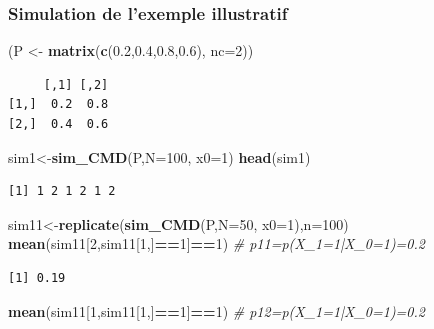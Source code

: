 \documentclass[
]{book}
\newenvironment{Shaded}{\begin{snugshade}}{\end{snugshade}}
\newcommand{\CommentTok}[1]{\textcolor[rgb]{0.56,0.35,0.01}{\textit{#1}}}
\newcommand{\DataTypeTok}[1]{\textcolor[rgb]{0.13,0.29,0.53}{#1}}
\newcommand{\DecValTok}[1]{\textcolor[rgb]{0.00,0.00,0.81}{#1}}
\newcommand{\FloatTok}[1]{\textcolor[rgb]{0.00,0.00,0.81}{#1}}
\newcommand{\KeywordTok}[1]{\textcolor[rgb]{0.13,0.29,0.53}{\textbf{#1}}}
\newcommand{\NormalTok}[1]{#1}
\newcommand{\OperatorTok}[1]{\textcolor[rgb]{0.81,0.36,0.00}{\textbf{#1}}}
\newcommand{\StringTok}[1]{\textcolor[rgb]{0.31,0.60,0.02}{#1}}
\theoremstyle{definition}
\theoremstyle{definition}
\theoremstyle{definition}
\theoremstyle{remark}
\begin{document}
\hypertarget{simulation-de-lexemple-illustratif}{%
\subsubsection{Simulation de l'exemple illustratif}\label{simulation-de-lexemple-illustratif}}

\begin{Shaded}
\begin{Highlighting}[]
\NormalTok{(P <-}\StringTok{ }\KeywordTok{matrix}\NormalTok{(}\KeywordTok{c}\NormalTok{(}\FloatTok{0.2}\NormalTok{,}\FloatTok{0.4}\NormalTok{,}\FloatTok{0.8}\NormalTok{,}\FloatTok{0.6}\NormalTok{), }\DataTypeTok{nc=}\DecValTok{2}\NormalTok{))}
\end{Highlighting}
\end{Shaded}

\begin{verbatim}
     [,1] [,2]
[1,]  0.2  0.8
[2,]  0.4  0.6
\end{verbatim}

\begin{Shaded}
\begin{Highlighting}[]
\NormalTok{sim1<-}\KeywordTok{sim_CMD}\NormalTok{(P,}\DataTypeTok{N=}\DecValTok{100}\NormalTok{, }\DataTypeTok{x0=}\DecValTok{1}\NormalTok{)}
\KeywordTok{head}\NormalTok{(sim1)}
\end{Highlighting}
\end{Shaded}

\begin{verbatim}
[1] 1 2 1 2 1 2
\end{verbatim}

\begin{Shaded}
\begin{Highlighting}[]
\NormalTok{sim11<-}\KeywordTok{replicate}\NormalTok{(}\KeywordTok{sim_CMD}\NormalTok{(P,}\DataTypeTok{N=}\DecValTok{50}\NormalTok{, }\DataTypeTok{x0=}\DecValTok{1}\NormalTok{),}\DataTypeTok{n=}\DecValTok{100}\NormalTok{)}
\KeywordTok{mean}\NormalTok{(sim11[}\DecValTok{2}\NormalTok{,sim11[}\DecValTok{1}\NormalTok{,]}\OperatorTok{==}\DecValTok{1}\NormalTok{]}\OperatorTok{==}\DecValTok{1}\NormalTok{) }\CommentTok{# p11=p(X_1=1|X_0=1)=0.2}
\end{Highlighting}
\end{Shaded}

\begin{verbatim}
[1] 0.19
\end{verbatim}

\begin{Shaded}
\begin{Highlighting}[]
\KeywordTok{mean}\NormalTok{(sim11[}\DecValTok{1}\NormalTok{,sim11[}\DecValTok{1}\NormalTok{,]}\OperatorTok{==}\DecValTok{1}\NormalTok{]}\OperatorTok{==}\DecValTok{1}\NormalTok{) }\CommentTok{# p12=p(X_1=1|X_0=1)=0.2}
\end{Highlighting}
\end{Shaded}
\end{document}
